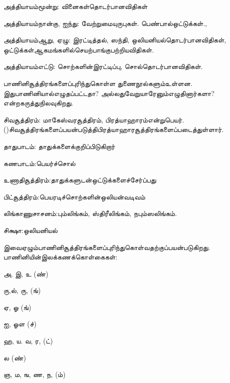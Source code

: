  \item அத்தியாயம்மூன்று: வினைகள்தொடர்பானவிதிகள்

 \item அத்தியாயம்நான்கு, ஐந்து: வேற்றுமையுருபுகள். பெண்பால்ஒட்டுக்கள்.,

 \item அத்தியாயம்ஆறு, ஏழு: இரட்டித்தல், ஸந்தி, ஒலியனியல்தொடர்பானவிதிகள், ஒட்டுக்கள்ஆகமங்களில்செயற்பாங்குபற்றியவிதிகள்.

 \item அத்தியாயம்எட்டு: சொற்களின்இரட்டிப்பு, சொல்தொடர்பானவிதிகள்.

பாணினிசூத்திரங்களைப்புரிந்துகொள்ள  துணைநூல்களும்உள்ளன. இதுபாணினியால்எழுதப்பட்டதா? அல்லதுவேறுயாரேனும்எழுதினார்களா? என்றகருத்துநிலவுகிறது.

\item சிவசூத்திரம்:  மாகேஸ்வரசூத்திரம், பிரத்யாஹாரம்என்றுபெயர். ()சிவசூத்திரங்களைப்பயன்படுத்திபிரத்யாஹாரசூத்திரங்களைப்படைத்துள்ளார்.

 \item தாதுபாடம்:  தாதுக்களைக்குறிப்பிடுகிறார்

 \item கணபாடம்:பெயர்ச்சொல்

 \item உணாதிசூத்திரம்:தாதுக்களுடன்ஒட்டுக்களைச்சேர்ப்பது

 \item பிட்சூத்திரம்:பெயரடிச்சொற்களின்ஒலியன்வடிவம்

 \item லிங்காணுசாசனம்:பும்லிங்கம், ஸ்திரீலிங்கம், நபும்ஸலிங்கம்.

 \item சிக்ஷா:ஒலியனியல்

இவைஏழும்பாணினிசூத்திரங்களைப்புரிந்துகொள்வதற்குப்பயன்படுகிறது. பாணினியின்இலக்கணக்கொள்கைகள்:

\item அ, இ, உ (ண்)

 \item ரு,ல், ரு, (ங்)

 \item ஏ, ஓ (ங்)

 \item ஐ, ஓள (ச்)

 \item ஹ, ய. வ, ர, (ட்) 

 \item ல (ண்)

 \item ஞ, ம, ங, ண, ந, (ம்)


